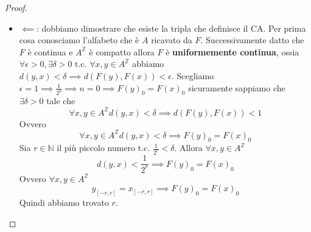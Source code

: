 \begin{teorema} 
\begin{proof}
\begin{itemize}
                  Successivamente dimostriamo $F\circ \sigma = \sigma \circ F\implies F(\sigma(x)) = \sigma(F(x)), \forall x \in A^\mathbb{Z}$.
                  l'uguaglianza precedente può essere riscritta come $\forall x \in A^\mathbb{Z}, \forall i \in \mathbb{Z}, (F(\sigma(x)))_i =(\sigma(F(x)))_i$.
                  Possiamo notare che
                  $$(F(\sigma(x)))_i = f(\sigma(x)_{[i-r,i+r]})=f(x_{[i-r+1,i+r+1]})$$
                  Inoltre
                  $$(\sigma(F(x)))_i =F(x)_{i+1} =f(x_{[i+1-r,i+1+r]})$$
                  Abbiamo dimostrato che commutano.
                  Successivamente dimostriamo $F\circ \sigma = \sigma \circ F\implies F(\sigma(x)) = \sigma(F(x)), \forall x \in A^\mathbb{Z}$.
                  l'uguaglianza precedente può essere riscritta come $\forall x \in A^\mathbb{Z}, \forall i \in \mathbb{Z}, (F(\sigma(x)))_i =(\sigma(F(x)))_i$.
                  Possiamo notare che
                  $$(F(\sigma(x)))_i = f(\sigma(x)_{[i-r,i+r]})=f(x_{[i-r+1,i+r+1]})$$
                  Inoltre
                  $$(\sigma(F(x)))_i =F(x)_{i+1} =f(x_{[i+1-r,i+1+r]})$$
                  Abbiamo dimostrato che commutano.
            \item $\impliedby$: dobbiamo dimostrare che esiste la tripla che definisce il CA.
                  Per prima cosa conosciamo l'alfabeto che è $A$ ricavato da $F$. Successivamente
                  datto che $F$ è continua e $A^\mathbb{Z}$ è compatto allora $F$ è \textbf{uniformemente
                      continua}, ossia $\forall\epsilon >0,\exists \delta > 0 \text{ t.c. } \forall x,y \in A^\mathbb{Z}$
                  abbiamo $d(y,x)<\delta \implies d(F(y), F(x)) < \epsilon$. Scegliamo $\epsilon = 1\implies \frac{1}{2^0}\implies n=0\implies F(y)_0= F(x)_0$
                  sicuramente sappiamo che $\exists \delta >0$ tale che $$\forall x,y \in A^\mathbb{Z} d(y,x)<\delta \implies d(F(y), F(x)) < 1$$
                  Ovvero $$\forall x,y \in A^\mathbb{Z} d(y,x)<\delta \implies F(y)_0= F(x)_0$$
                  Sia $r\in \mathbb{N}$ il più piccolo numero t.c. $\frac{1}{2^r}<\delta$.
                  Allora $\forall x,y \in A^\mathbb{Z}$
                  $$d(y,x)<\frac{1}{2^r} \implies F(y)_0= F(x)_0$$
                  Ovvero $\forall x,y \in A^\mathbb{Z}$
                  $$y_{[-r,r]} =x_{[-r,r]}\implies F(y)_0= F(x)_0$$
                  Quindi abbiamo trovato $r$.


\end{itemize}
\end{proof}
\end{teorema}
